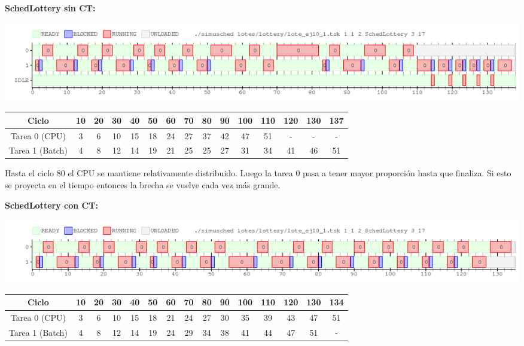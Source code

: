 \begin{flushleft}
\textbf{SchedLottery sin CT:}\end{flushleft} %

\begin{center}
 \includegraphics[scale=0.48]{./Lottery/ej10_SIN_CT.png}
\end{center}

\begin{center}
\begin{tabular}{|c|c|c|c|c|c|c|c|c|c|c|c|c|c|c|}
\hline
Ciclo & 10 & 20 & 30 & 40 & 50 & 60 & 70 & 80 & 90 & 100 & 110 & 120 & 130 & 137\\
\hline
\hline
Tarea 0 (CPU) & 3 & 6 & 10 & 15 & 18 & 24 & 27 & 37 & 42 & 47 & 51 & - & - & - \\
\hline
Tarea 1 (Batch) & 4 & 8 & 12 & 14 & 19 & 21 & 25 & 25 & 27 & 31 & 34 & 41 & 46 & 51 \\
\hline
\end{tabular}\end{center}

Hasta el ciclo 80 el CPU se mantiene relativamente distribuido. Luego la tarea 0 pasa a tener mayor proporción hasta que finaliza. 
Si esto se proyecta en el tiempo entonces la brecha se vuelve cada vez más grande.

\begin{flushleft}
\textbf{SchedLottery con CT:}\end{flushleft} %

\begin{center}
 \includegraphics[scale=0.48]{./Lottery/ej10_CON_CT.png}
\end{center}

\begin{center}
\begin{tabular}{|c|c|c|c|c|c|c|c|c|c|c|c|c|c|c|}
\hline
Ciclo & 10 & 20 & 30 & 40 & 50 & 60 & 70 & 80 & 90 & 100 & 110 & 120 & 130 & 134 \\
\hline
\hline
Tarea 0 (CPU) & 3 & 6 & 10 & 15 & 18 & 21 & 24 & 27 & 30 & 35 & 39 & 43 & 47 & 51\\
\hline
Tarea 1 (Batch) & 4 & 8 & 12 & 14 & 19 & 24 & 29 & 34 & 38 & 41 & 44 & 47 & 51 & -\\
\hline
\end{tabular}\end{center}

